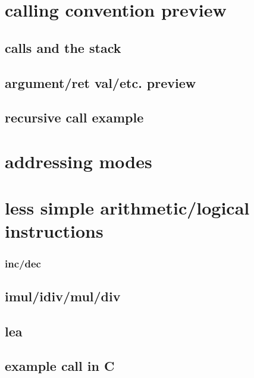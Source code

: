

\section{calling convention preview}

\subsection{calls and the stack}



\subsection{argument/ret val/etc. preview}



\subsection{recursive call example}



\section{addressing modes}



\section{less simple arithmetic/logical instructions}

\subsubsection{inc/dec}



\subsection{imul/idiv/mul/div}



\subsection{lea}



\subsection{example call in C}

